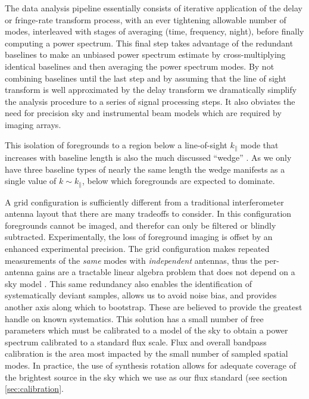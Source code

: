 \documentclass[preprint2]{aastex}
\begin{document}
The data analysis pipeline essentially consists of iterative application of the delay or fringe-rate transform process, with an ever tightening allowable number of modes, interleaved with stages of averaging (time, frequency, night), before finally computing a power spectrum.  This final step takes advantage of the redundant baselines to make an unbiased power spectrum estimate by cross-multiplying identical baselines and then averaging the power spectrum modes. By not combining baselines until the last step and by assuming that the line of sight transform is well approximated by the delay transform we dramatically simplify the analysis procedure to a series of signal processing steps. It also obviates the need for precision sky and instrumental beam models which are required by imaging arrays.  

This isolation of foregrounds to a region below a line-of-sight $k_\parallel$ mode that increases with baseline length is also the much discussed ``wedge'' \citep{PhysRevD.90.023018,PhysRevD.90.023019,Thyagarajan:2013p10039,Pober:2013p9942,Trott:2012p10466,Morales:2012p8790,Parsons:2012p8896,Vedantham:2012p10297,Datta:2010p8781,Parsons:2009p7859}. As we only have three baseline types of nearly the same length the wedge manifests as a single value of $k\sim k_\parallel$, below which foregrounds are expected to dominate. 

A grid configuration is sufficiently different from a traditional interferometer antenna layout that 
there are many tradeoffs to consider. In this configuration foregrounds cannot be imaged, and therefor can only be filtered or blindly subtracted.  Experimentally, the loss of foreground imaging is offset by an enhanced experimental precision. The grid configuration makes repeated measurements of the \emph{same} modes with \emph{independent} antennas, thus the per-antenna gains are a tractable linear algebra problem that does not depend on a sky model \citep{Liu:2010p10391}. This same redundancy also enables the identification of systematically deviant samples, allows us to avoid noise bias, and provides another axis along which to bootstrap.  These are believed to provide the greatest handle on known systematics.  This solution has a small number of free parameters which must be calibrated to a model of the sky to obtain a power spectrum calibrated to a standard flux scale.  Flux and overall bandpass calibration is the area most impacted by the small number of sampled spatial modes.  In practice, the use of synthesis rotation allows for adequate coverage of the brightest source in the sky which we use as our flux standard (see section \ref{sec:calibration}. 
\end{document}
